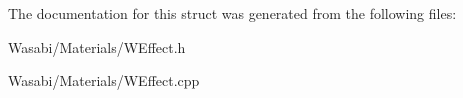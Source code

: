 The documentation for this struct was generated from the following files\+:\begin{DoxyCompactItemize}
\item 
Wasabi/\+Materials/W\+Effect.\+h\item 
Wasabi/\+Materials/W\+Effect.\+cpp\end{DoxyCompactItemize}

